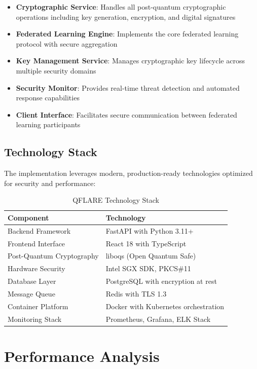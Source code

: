 ﻿\documentclass[12pt,a4paper,twoside]{book}
\begin{document}
\begin{itemize}
\item \textbf{Cryptographic Service}: Handles all post-quantum cryptographic operations including key generation, encryption, and digital signatures
\item \textbf{Federated Learning Engine}: Implements the core federated learning protocol with secure aggregation
\item \textbf{Key Management Service}: Manages cryptographic key lifecycle across multiple security domains
\item \textbf{Security Monitor}: Provides real-time threat detection and automated response capabilities
\item \textbf{Client Interface}: Facilitates secure communication between federated learning participants
\end{itemize}

\subsection{Technology Stack}
\label{subsec:tech-stack}

The implementation leverages modern, production-ready technologies optimized for security and performance:

\begin{table}[htbp]
\centering
\caption{QFLARE Technology Stack}
\label{tab:tech-stack}
\begin{tabular}{@{}ll@{}}
\toprule
Component & Technology \\
\midrule
Backend Framework & FastAPI with Python 3.11+ \\
Frontend Interface & React 18 with TypeScript \\
Post-Quantum Cryptography & liboqs (Open Quantum Safe) \\
Hardware Security & Intel SGX SDK, PKCS\#11 \\
Database Layer & PostgreSQL with encryption at rest \\
Message Queue & Redis with TLS 1.3 \\
Container Platform & Docker with Kubernetes orchestration \\
Monitoring Stack & Prometheus, Grafana, ELK Stack \\
\bottomrule
\end{tabular}
\end{table}

\section{Performance Analysis}
\label{sec:performance-analysis}
\end{document}
